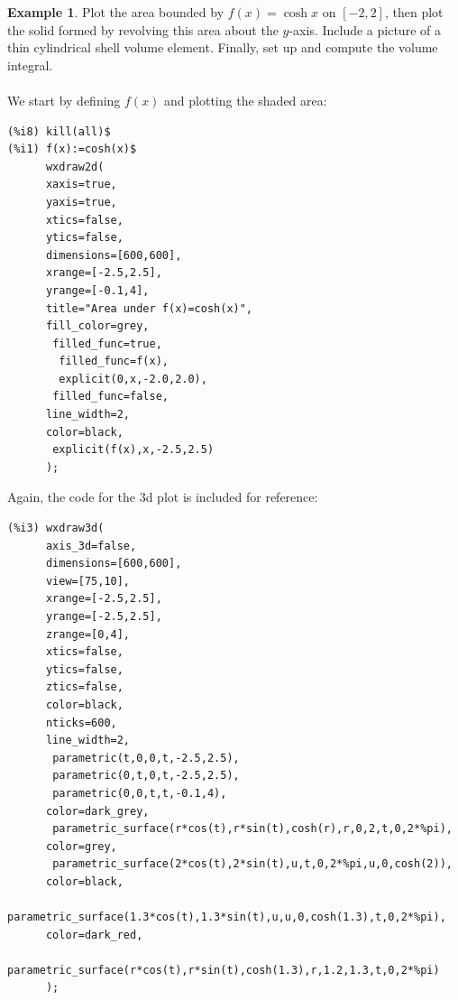 \documentclass[10.5pt,twoside]{report}
\theoremstyle{definition}
\newtheorem{exmp}{Example}[section]
\begin{document}
\begin{exmp} Plot the area bounded by $f(x)=\cosh{x}$ on $[-2,2]$, then plot the solid formed by revolving this area about the $y$-axis.  Include a picture of a thin cylindrical shell volume element.  Finally, set up and compute the volume integral.\\

${}$\\

We start by defining $f(x)$ and plotting the shaded area:

\begin{verbatim}
(%i8) kill(all)$
(%i1) f(x):=cosh(x)$
      wxdraw2d(
      xaxis=true,
      yaxis=true,
      xtics=false,
      ytics=false,
      dimensions=[600,600],
      xrange=[-2.5,2.5],
      yrange=[-0.1,4],
      title="Area under f(x)=cosh(x)",
      fill_color=grey,
       filled_func=true,
        filled_func=f(x),
        explicit(0,x,-2.0,2.0),
       filled_func=false,
      line_width=2,
      color=black,
       explicit(f(x),x,-2.5,2.5)
      );
\end{verbatim}


Again, the code for the 3d plot is included for reference:

\begin{verbatim}
(%i3) wxdraw3d(  
      axis_3d=false,
      dimensions=[600,600],
      view=[75,10],
      xrange=[-2.5,2.5],
      yrange=[-2.5,2.5],
      zrange=[0,4],
      xtics=false,
      ytics=false,
      ztics=false,
      color=black,
      nticks=600,
      line_width=2,
       parametric(t,0,0,t,-2.5,2.5),
       parametric(0,t,0,t,-2.5,2.5),
       parametric(0,0,t,t,-0.1,4), 
      color=dark_grey,
       parametric_surface(r*cos(t),r*sin(t),cosh(r),r,0,2,t,0,2*%pi),
      color=grey,
       parametric_surface(2*cos(t),2*sin(t),u,t,0,2*%pi,u,0,cosh(2)),
      color=black,
       parametric_surface(1.3*cos(t),1.3*sin(t),u,u,0,cosh(1.3),t,0,2*%pi),
      color=dark_red,
       parametric_surface(r*cos(t),r*sin(t),cosh(1.3),r,1.2,1.3,t,0,2*%pi)
      );
\end{verbatim}


\end{exmp}
\end{document}
